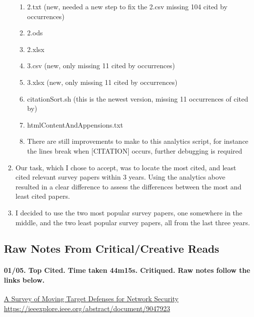 \documentclass{article}
\begin{document}
\begin{enumerate}
\begin{enumerate}
                    \item 2.txt (new, needed a new step to fix the 2.csv missing 104 cited by occurrences)
                    \item 2.ods
                    \item 2.xlsx
                    \item 3.csv (new, only missing 11 cited by occurrences)
                    \item 3.xlsx (new, only missing 11 cited by occurrences)
                    \item citationSort.sh (this is the newest version, missing 11 occurrences of cited by)
                    \item htmlContentAndAppensions.txt
                    \item There are still improvements to make to this analytics script, for instance the lines break when [CITATION] occurs, further debugging is required
                \end{enumerate}
            \item Our task, which I chose to accept, was to locate the most cited, and least cited relevant survey papers within 3 years. Using the analytics above resulted in a clear difference to assess the differences between the most and least cited papers.
            \item I decided to use the two most popular survey papers, one somewhere in the middle, and the two least popular survey papers, all from the last three years.
\end{enumerate}


    \subsection{Raw Notes From Critical/Creative Reads}
        \paragraph{
            \cite{sengupta_survey_2020}01/05. Top Cited. Time taken 44m15s. Critiqued. Raw notes follow the links below.
        }
        \hfill \break
        \href{
            https://ieeexplore.ieee.org/abstract/document/9047923
        }
            {A Survey of Moving Target Defenses for Network Security}
            \\
        \url{https://ieeexplore.ieee.org/abstract/document/9047923}
        \\\\
\end{document}
